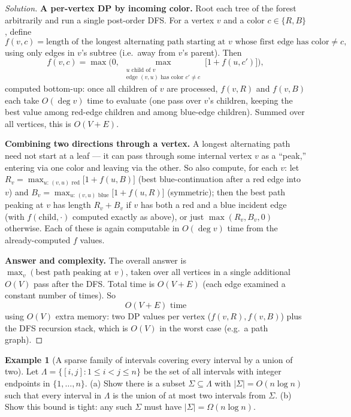 \documentclass[11pt]{article}
\theoremstyle{definition}
\newtheorem{example}{Example}[section]
\begin{document}
\begin{proof}[Solution]
\textbf{A per-vertex DP by incoming color.} Root each tree of the forest arbitrarily and run a single post-order DFS. For a vertex $v$ and a color $c\in\{R,B\}$, define
\[
f(v,c)=\text{length of the longest alternating path starting at }v\text{ whose first edge has color}\neq c,
\]
using only edges in $v$'s subtree (i.e.\ away from $v$'s parent). Then
\[
f(v,c)=\max\Big(0,\ \max_{\substack{u \text{ child of } v\\ \text{edge }(v,u)\text{ has color }c'\neq c}} \big[1+f(u,c')\big]\Big),
\]
computed bottom-up: once all children of $v$ are processed, $f(v,R)$ and $f(v,B)$ each take $O(\deg v)$ time to evaluate (one pass over $v$'s children, keeping the best value among red-edge children and among blue-edge children). Summed over all vertices, this is $O(V+E)$.

\textbf{Combining two directions through a vertex.} A longest alternating path need not start at a leaf — it can pass through some internal vertex $v$ as a ``peak,'' entering via one color and leaving via the other. So also compute, for each $v$: let $R_v=\max_{u:\,(v,u)\text{ red}}\big[1+f(u,B)\big]$ (best blue-continuation after a red edge into $v$) and $B_v=\max_{u:\,(v,u)\text{ blue}}\big[1+f(u,R)\big]$ (symmetric); then the best path peaking at $v$ has length $R_v+B_v$ if $v$ has both a red and a blue incident edge (with $f(\text{child},\cdot)$ computed exactly as above), or just $\max(R_v,B_v,0)$ otherwise. Each of these is again computable in $O(\deg v)$ time from the already-computed $f$ values.

\textbf{Answer and complexity.} The overall answer is $\max_v(\text{best path peaking at } v)$, taken over all vertices in a single additional $O(V)$ pass after the DFS. Total time is $O(V+E)$ (each edge examined a constant number of times). So
\[
\boxed{O(V+E)\text{ time}}
\]
using $O(V)$ extra memory: two DP values per vertex ($f(v,R),f(v,B)$) plus the DFS recursion stack, which is $O(V)$ in the worst case (e.g.\ a path graph).
\end{proof}

\begin{example}[A sparse family of intervals covering every interval by a union of two]
Let $\Lambda=\{[i,j] : 1\le i<j\le n\}$ be the set of all intervals with integer endpoints in $\{1,\dots,n\}$. (a) Show there is a subset $\Sigma\subseteq\Lambda$ with $|\Sigma|=O(n\log n)$ such that every interval in $\Lambda$ is the union of at most two intervals from $\Sigma$. (b) Show this bound is tight: any such $\Sigma$ must have $|\Sigma|=\Omega(n\log n)$.
\end{example}
\end{document}
